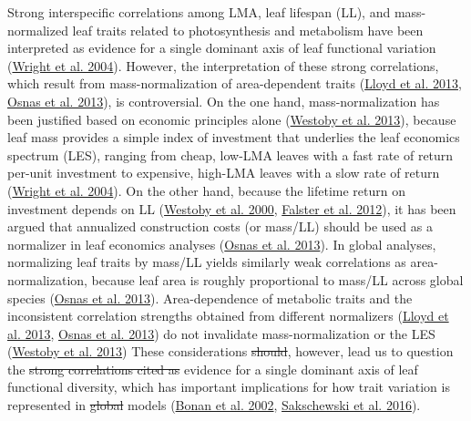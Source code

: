 \documentclass[
  12pt,
  a4paper,
,tablecaptionabove
]{scrartcl}
\providecommand{\DIFaddtex}[1]{{\protect\color{blue}\uwave{#1}}} %
\providecommand{\DIFdeltex}[1]{{\protect\color{red}\sout{#1}}}                      %
\providecommand{\DIFaddbegin}{} %
\providecommand{\DIFaddend}{} %
\providecommand{\DIFdelbegin}{} %
\providecommand{\DIFdelend}{} %
\providecommand{\DIFadd}[1]{\texorpdfstring{\DIFaddtex{#1}}{#1}} %
\providecommand{\DIFdel}[1]{\texorpdfstring{\DIFdeltex{#1}}{}} %
\newcommand{\DIFscaledelfig}{0.5}
\newlength{\DIFdelgraphicswidth} %
\newlength{\DIFdelgraphicsheight} %
\newcommand{\DIFaddincludegraphics}[2][]{{\color{blue}\fbox{\DIFOincludegraphics[#1]{#2}}}} %
\newcommand{\DIFdelincludegraphics}[2][]{%
\sbox{\DIFdelgraphicsbox}{\DIFOincludegraphics[#1]{#2}}%
\settoboxwidth{\DIFdelgraphicswidth}{\DIFdelgraphicsbox} %
\settoboxtotalheight{\DIFdelgraphicsheight}{\DIFdelgraphicsbox} %
\scalebox{\DIFscaledelfig}{%
\parbox[b]{\DIFdelgraphicswidth}{\usebox{\DIFdelgraphicsbox}\\[-\baselineskip] \rule{\DIFdelgraphicswidth}{0em}}\llap{\resizebox{\DIFdelgraphicswidth}{\DIFdelgraphicsheight}{%
\setlength{\unitlength}{\DIFdelgraphicswidth}%
\begin{picture}(1,1)%
\thicklines\linethickness{2pt} %
{\color[rgb]{1,0,0}\put(0,0){\framebox(1,1){}}}%
{\color[rgb]{1,0,0}\put(0,0){\line( 1,1){1}}}%
{\color[rgb]{1,0,0}\put(0,1){\line(1,-1){1}}}%
\end{picture}%
}\hspace*{3pt}}} %
} %
\DeclareRobustCommand{\DIFaddbegin}{\DIFOaddbegin \let\includegraphics\DIFaddincludegraphics} %
\DeclareRobustCommand{\DIFaddend}{\DIFOaddend \let\includegraphics\DIFOincludegraphics} %
\DeclareRobustCommand{\DIFdelbegin}{\DIFOdelbegin \let\includegraphics\DIFdelincludegraphics} %
\DeclareRobustCommand{\DIFdelend}{\DIFOaddend \let\includegraphics\DIFOincludegraphics} %
\begin{document}
Strong interspecific correlations among LMA, leaf lifespan (LL), and mass-normalized leaf traits related to photosynthesis and metabolism have been interpreted as evidence for a single dominant axis of leaf functional variation (\protect\hyperlink{ref-Wright2004a}{Wright et al. 2004}).
However, the interpretation of these strong correlations, which result from mass-normalization of area-dependent traits (\protect\hyperlink{ref-Lloyd2013}{Lloyd et al. 2013}, \protect\hyperlink{ref-Osnas2013}{Osnas et al. 2013}), is controversial.
On the one hand, mass-normalization has been justified based on economic principles alone (\protect\hyperlink{ref-Westoby2013}{Westoby et al. 2013}), because leaf mass provides a simple index of investment that underlies the leaf economics spectrum (LES), ranging from cheap, low-LMA leaves with a fast rate of return per-unit investment to expensive, high-LMA leaves with a slow rate of return (\protect\hyperlink{ref-Wright2004a}{Wright et al. 2004}).
On the other hand, because the lifetime return on investment depends on LL (\protect\hyperlink{ref-Westoby2000}{Westoby et al. 2000}, \protect\hyperlink{ref-Falster2012}{Falster et al. 2012}), it has been argued that annualized construction costs (or mass/LL) should be used as a normalizer in leaf economics analyses (\protect\hyperlink{ref-Osnas2013}{Osnas et al. 2013}).
In global analyses, normalizing leaf traits by mass/LL yields similarly weak correlations as area-normalization, because leaf area is roughly proportional to mass/LL across global species (\protect\hyperlink{ref-Osnas2013}{Osnas et al. 2013}).
Area-dependence of metabolic traits and the inconsistent correlation strengths obtained from different normalizers (\protect\hyperlink{ref-Lloyd2013}{Lloyd et al. 2013}, \protect\hyperlink{ref-Osnas2013}{Osnas et al. 2013}) do not invalidate mass-normalization or the LES (\protect\hyperlink{ref-Westoby2013}{Westoby et al. 2013})
These considerations \DIFdelbegin \DIFdel{should}\DIFdelend \DIFaddbegin \DIFadd{do}\DIFaddend , however, lead us to question the \DIFdelbegin \DIFdel{strong correlations cited as }\DIFdelend evidence for a single dominant axis of leaf functional diversity, which has important implications for how trait variation is represented in \DIFdelbegin \DIFdel{global }\DIFdelend \DIFaddbegin \DIFadd{vegetation }\DIFaddend models (\protect\hyperlink{ref-Bonan2002}{Bonan et al. 2002}, \protect\hyperlink{ref-Sakschewski2016}{Sakschewski et al. 2016}).
\end{document}
